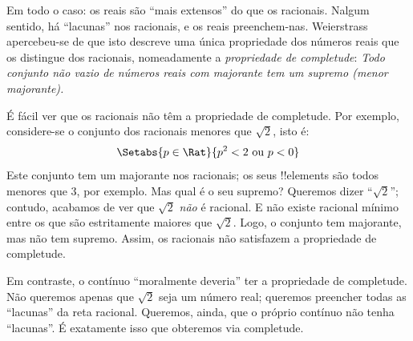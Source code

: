 \documentclass[../../../include/open-logic-section]{subfiles}
\begin{document}
Em todo o caso: os reais são ``mais extensos'' do que os racionais. Nalgum
sentido, há ``lacunas'' nos racionais, e os reais preenchem-nas. Weierstrass
apercebeu-se de que isto descreve uma única propriedade dos números reais que os
distingue dos racionais, nomeadamente a \emph{propriedade de completude}:
\emph{Todo conjunto não vazio de números reais com majorante tem um supremo
(menor majorante).}

É fácil ver que os racionais não têm a propriedade de completude. Por exemplo,
considere-se o conjunto dos racionais menores que $\sqrt{2}$, isto é:
\[
	\Setabs{p \in \Rat}{p^2 < 2 \text{ ou }p < 0}
\]
Este conjunto tem um majorante nos racionais; os seus !!{element}s são todos
menores que $3$, por exemplo. Mas qual é o seu supremo? Queremos dizer
``$\sqrt{2}$''; contudo, acabamos de ver que $\sqrt{2}$ \emph{não} é racional. E
não existe racional mínimo entre os que são estritamente maiores que
$\sqrt{2}$. Logo, o conjunto tem majorante, mas não tem supremo. Assim, os
racionais não satisfazem a propriedade de completude.

Em contraste, o contínuo ``moralmente deveria'' ter a propriedade de completude.
Não queremos apenas que $\sqrt{2}$ seja um número real; queremos preencher todas
as ``lacunas'' da reta racional. Queremos, ainda, que o próprio contínuo não tenha
``lacunas''. É exatamente isso que obteremos via completude.
\end{document}
